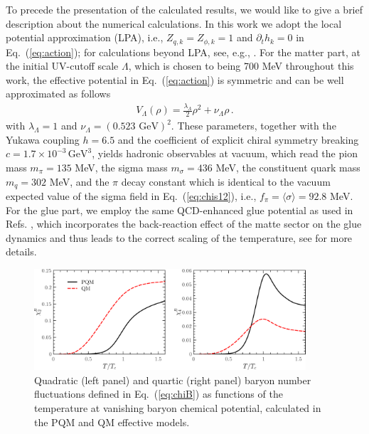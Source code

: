 \documentclass[final,5p,times,twocolumn,colorlinks=true,citecolor=blue,linkcolor=blue]{elsarticle}
\def\Eq#1{Eq.~(\ref{#1})}
\begin{document}
To precede the presentation of the calculated results, we would like to give a brief description about the numerical calculations. In this work we adopt the local potential approximation (LPA), i.e., $Z_{q,k}=Z_{\phi,k}=1$ and $\partial_t h_{k}=0$ in \Eq{eq:action}; for calculations beyond LPA, see, e.g., \cite{Fu:2015naa,Fu:2015amv,Fu:2016tey}. For the matter part, at the initial UV-cutoff scale $\Lambda$, which is chosen to being 700 MeV throughout this work, the effective potential in \Eq{eq:action} is symmetric and can be well approximated as follows
\begin{align}
  V_{\Lambda}(\rho)=\frac{\lambda_{\Lambda}}{2}\rho^2+\nu_{\Lambda}\rho\,.\label{}
\end{align}
with $\lambda_{\Lambda}=1$ and $\nu_{\Lambda}=(0.523\text{ GeV})^2$. These parameters, together with the Yukawa coupling $h=6.5$ and the coefficient of explicit chiral symmetry breaking $c=1.7\times 10^{-3}\,\text{GeV}^3$, yields hadronic observables at vacuum, which read the pion mass $m_{\pi}=135$ MeV, the sigma mass $m_{\sigma}=436$ MeV, the constituent quark mass $m_{q}=302$ MeV, and the $\pi$ decay constant which is identical to the vacuum expected value of the sigma field in \Eq{eq:chis12}, i.e., $f_{\pi}=\langle \sigma \rangle=92.8$ MeV. For the glue part, we employ the same QCD-enhanced glue potential as used in Refs. \cite{Fu:2015naa,Fu:2015amv}, which incorporates the back-reaction effect of the matte sector on the glue dynamics and thus leads to the correct scaling of the temperature, see \cite{Haas:2013qwp} for more details.

%
\begin{figure}[t]
\includegraphics[width=0.9\textwidth]{chiB}
\caption{Quadratic (left panel) and quartic (right panel) baryon number fluctuations defined in \Eq{eq:chiB} as functions of the temperature at vanishing baryon chemical potential, calculated in the PQM and QM effective models.}\label{fig:chiB}
\end{figure}
%
\end{document}

